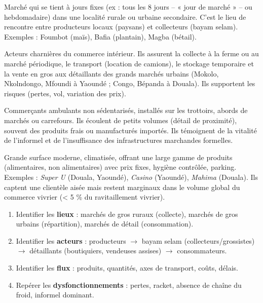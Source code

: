 \documentclass[11pt]{article}
\newcommand{\cle}[1]{{\popxbold\color{popdark}#1}}
\newcounter{popsec}
\newcounter{popsub}
\newcommand{\courssub}[1]{%
  \stepcounter{popsub}%
  \par\vspace{9pt}\noindent{\popxbold\fontsize{11.5}{13}\selectfont\color{popink}{\color{poporange}\thepopsec.\thepopsub}\hspace{6pt}#1}\par\nopagebreak\vspace{4pt}
}
\begin{document}
\courssub{L'organisation du commerce intérieur}

\begin{definition}
Marché qui se tient à jours fixes (ex : tous les 8 jours -- « jour de marché » -- ou hebdomadaire) dans une localité rurale ou urbaine secondaire. C'est le lieu de rencontre entre producteurs locaux (paysans) et collecteurs (bayam selam). Exemples : Foumbot (maïs), Bafia (plantain), Magba (bétail).
\end{definition}

\begin{definition}
Acteurs charnières du commerce intérieur. Ils assurent la \cle{collecte} à la ferme ou au marché périodique, le \cle{transport} (location de camions), le \cle{stockage} temporaire et la \cle{vente en gros} aux détaillants des grands marchés urbains (Mokolo, Nkolndongo, Mfoundi à Yaoundé ; Congo, Bépanda à Douala). Ils supportent les risques (pertes, vol, variation des prix).
\end{definition}

\begin{definition}
Commerçants ambulants non sédentarisés, installés sur les trottoirs, abords de marchés ou carrefours. Ils écoulent de petits volumes (détail de proximité), souvent des produits frais ou manufacturés importés. Ils témoignent de la vitalité de l'informel et de l'insuffisance des infrastructures marchandes formelles.
\end{definition}

\begin{definition}
Grande surface moderne, climatisée, offrant une large gamme de produits (alimentaires, non alimentaires) avec prix fixes, hygiène contrôlée, parking. Exemples : \emph{Super U} (Douala, Yaoundé), \emph{Casino} (Yaoundé), \emph{Mahima} (Douala). Ils captent une clientèle aisée mais restent marginaux dans le volume global du commerce vivrier (< 5 \% du ravitaillement vivrier).
\end{definition}

\begin{methode}
\begin{enumerate}
\item Identifier les \textbf{lieux} : marchés de gros ruraux (collecte), marchés de gros urbains (répartition), marchés de détail (consommation).
\item Identifier les \textbf{acteurs} : producteurs $\rightarrow$ bayam selam (collecteurs/grossistes) $\rightarrow$ détaillants (boutiquiers, vendeuses assises) $\rightarrow$ consommateurs.
\item Identifier les \textbf{flux} : produits, quantités, axes de transport, coûts, délais.
\item Repérer les \textbf{dysfonctionnements} : pertes, racket, absence de chaîne du froid, informel dominant.
\end{enumerate}
\end{methode}
\end{document}
